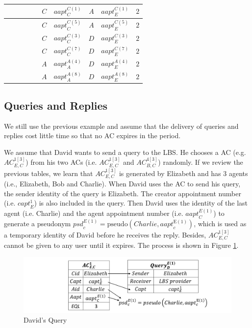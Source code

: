 \begin{table} [H]
\begin{tabu}{|c|c|c|c|c|c|c|c|c|c|}
 &  &  &  &  & $C$ & ${aapt}_{C}^{C\left(1\right)}$ & $A$ & ${aapt}_{E}^{C\left(1\right)}$ & $2$ \\ \hline
 &  &  &  &  & $C$ & ${aapt}_{C}^{C\left(5\right)}$ & $A$ & ${aapt}_{E}^{C\left(5\right)}$ & $2$ \\ \hline
 &  &  &  &  & $C$ & ${aapt}_{C}^{C\left(3\right)}$ & $D$ & ${aapt}_{E}^{C\left(3\right)}$ & $2$ \\ \hline
 &  &  &  &  & $C$ & ${aapt}_{C}^{C\left(7\right)}$ & $D$ & ${aapt}_{E}^{C\left(7\right)}$ & $2$ \\ \hline
 &  &  &  &  & $A$ & ${aapt}_{A}^{A\left(4\right)}$ & $D$ & ${aapt}_{E}^{A\left(4\right)}$ & $2$ \\ \hline
 &  &  &  &  & $A$ & ${aapt}_{A}^{A\left(8\right)}$ & $D$ & ${aapt}_{E}^{A\left(8\right)}$ & $2$ \\ \hline
\end{tabu}
\end{table}


\subsection{ Queries and Replies}

\noindent We still use the previous example and assume that the delivery of queries and replies cost little time so that no AC expires in the period.

We assume that David wants to send a query to the LBS. He chooses a AC (e.g. ${AC}^{1\left[3\right]}_{E,C}$) from his two ACs (i.e. ${AC}^{1\left[3\right]}_{E,C}$ and ${AC}^{4\left[3\right]}_{B,C}$) randomly. If we review the previous tables, we learn that ${AC}^{1\left[3\right]}_{E,C}$ is generated by Elizabeth and has 3 agents (i.e., Elizabeth, Bob and Charlie). When David uses the AC to send his query, the sender identity of the query is Elizabeth. The creator appointment number (i.e. ${capt}^1_E$) is also included in the query. Then David uses the identity of the last agent (i.e. Charlie) and the agent appointment number (i.e. ${aapt}^{E\left(1\right)}_C$) to generate a pseudonym ${psd}^{E\left(1\right)}_c=\mathrm{pseudo}\left(Charlie,{aapt}^{\mathrm{E}\left(1\right)}_c\right)$, which is used as a temporary identity of David before he receives the reply. Besides, ${AC}^{1\left[3\right]}_{E,C}$ cannot be given to any user until it expires. The process is shown in Figure \ref{fig:DavidsQuery}.

\begin{figure} [H]
  \centering 
  \includegraphics[width=6.0in]{figures/FIG_4_10_Davids_Query.png}
  \caption{David's Query} 
  \label{fig:DavidsQuery} %
\end{figure}

